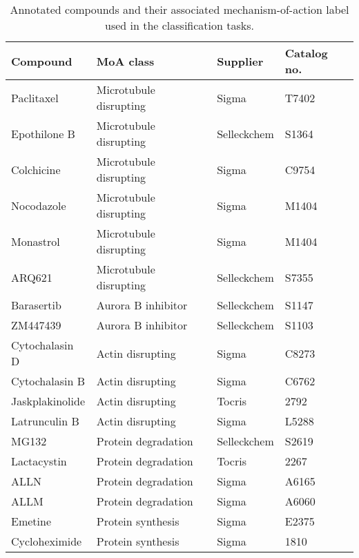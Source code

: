 \documentclass[a4paper,11pt,twoside,openright]{scrbook}
\begin{document}
\begin{table}[]
    \begin{footnotesize}
    \centering
    \captionsetup{width=0.8\textwidth}
    \caption[Annotated compounds of known MoA]{Annotated compounds and their associated mechanism-of-action label used 
in the classification tasks.}
    \label{table:compounds}
    \begin{tabular}{@{}llll@{}}
    \toprule
    Compound        & MoA class               & Supplier    & Catalog no. \\ \midrule
    Paclitaxel      & Microtubule disrupting  & Sigma       & T7402       \\
    Epothilone B    & Microtubule disrupting  & Selleckchem & S1364       \\
    Colchicine      & Microtubule disrupting  & Sigma       & C9754       \\
    Nocodazole      & Microtubule disrupting  & Sigma       & M1404       \\
    Monastrol       & Microtubule disrupting  & Sigma       & M1404       \\
    ARQ621          & Microtubule disrupting  & Selleckchem & S7355       \\
    Barasertib      & Aurora B inhibitor      & Selleckchem & S1147       \\
    ZM447439        & Aurora B inhibitor      & Selleckchem & S1103       \\
    Cytochalasin D  & Actin disrupting        & Sigma       & C8273       \\
    Cytochalasin B  & Actin disrupting        & Sigma       & C6762       \\
    Jaskplakinolide & Actin disrupting        & Tocris      & 2792        \\
    Latrunculin B   & Actin disrupting        & Sigma       & L5288       \\
    MG132           & Protein degradation     & Selleckchem & S2619       \\
    Lactacystin     & Protein degradation     & Tocris      & 2267        \\
    ALLN            & Protein degradation     & Sigma       & A6165       \\
    ALLM            & Protein degradation     & Sigma       & A6060       \\
    Emetine         & Protein synthesis       & Sigma       & E2375       \\
    Cycloheximide   & Protein synthesis       & Sigma       & 1810        \\

\end{tabular}
\end{footnotesize}
\end{table}
\end{document}
